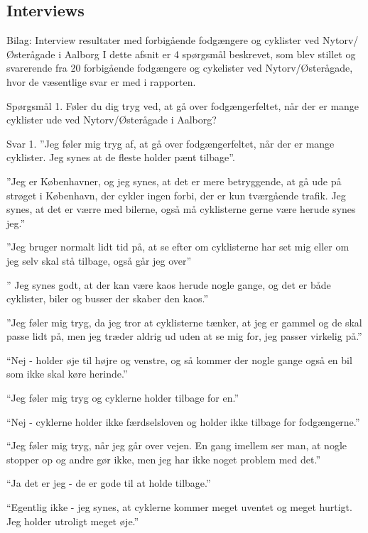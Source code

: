 \appendix
\label{appendix_start}
\begin{appendics}
  \chapter{Interviews}
  \label{chap:interviews}
  Bilag: Interview resultater med forbigående fodgængere og cyklister ved Nytorv/Østerågade i Aalborg
I dette afsnit er 4 spørgsmål beskrevet, som blev stillet og svarerende fra 20 forbigående fodgængere og cykelister ved Nytorv/Østerågade, hvor de væsentlige svar er med i rapporten.

Spørgsmål 1.
Føler du dig tryg ved, at gå over fodgængerfeltet, når der er mange cyklister ude ved Nytorv/Østerågade i Aalborg?

Svar 1.
”Jeg føler mig tryg af, at gå over fodgængerfeltet, når der er mange cyklister. Jeg synes at de fleste holder pænt tilbage”.

”Jeg er Københavner, og jeg synes, at det er mere betryggende, at gå ude på strøget i København, der cykler ingen forbi, der er kun tværgående trafik. Jeg synes, at det er værre med bilerne, også må cyklisterne gerne være herude synes jeg.”

”Jeg bruger normalt lidt tid på, at se efter om cyklisterne har set mig eller om jeg selv skal stå tilbage, også går jeg over”

” Jeg synes godt, at der kan være kaos herude nogle gange, og det er både cyklister, biler og busser der skaber den kaos.”

”Jeg føler mig tryg, da jeg tror at cyklisterne tænker, at jeg er gammel og de skal passe lidt på, men jeg træder aldrig ud uden at se mig for, jeg passer virkelig på.”

“Nej - holder øje til højre og venstre, og så kommer der nogle gange også en bil som ikke skal køre herinde.”

“Jeg føler mig tryg og cyklerne holder tilbage for en.”

“Nej - cyklerne holder ikke færdselsloven og holder ikke tilbage for fodgængerne.”

“Jeg føler mig tryg, når jeg går over vejen. En gang imellem ser man, at nogle stopper op og andre gør ikke, men jeg har ikke noget problem med det.”

“Ja det er jeg - de er gode til at holde tilbage.”

“Egentlig ikke - jeg synes, at cyklerne kommer meget uventet og meget hurtigt. Jeg holder utroligt meget øje.”


\end{appendics}
